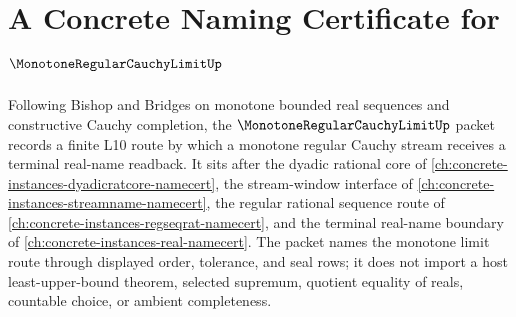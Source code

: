 \chapter{A Concrete Naming Certificate for $\MonotoneRegularCauchyLimitUp$}
\label{ch:concrete-instances-monotone-regular-cauchy-limit-namecert}

Following Bishop and Bridges on monotone bounded real sequences and constructive Cauchy completion, the $\MonotoneRegularCauchyLimitUp$ packet records a finite L10 route by which a monotone regular Cauchy stream receives a terminal real-name readback. It sits after the dyadic rational core of \autoref{ch:concrete-instances-dyadicratcore-namecert}, the stream-window interface of \autoref{ch:concrete-instances-streamname-namecert}, the regular rational sequence route of \autoref{ch:concrete-instances-regseqrat-namecert}, and the terminal real-name boundary of \autoref{ch:concrete-instances-real-namecert}. The packet names the monotone limit route through displayed order, tolerance, and seal rows; it does not import a host least-upper-bound theorem, selected supremum, quotient equality of reals, countable choice, or ambient completeness.

